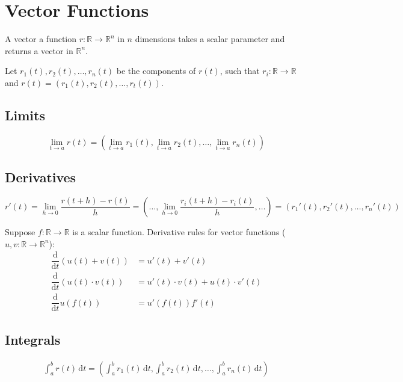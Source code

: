 \documentclass{article}
\newcommand*{\deriv}[1][x]{\ensuremath{\dfrac{\mathrm{d}}{\mathrm{d}#1}}}
\begin{document}
\section{Vector Functions}

A vector a function $r:\mathbb R\to\mathbb R^n$ in $n$ dimensions takes a scalar parameter and returns a vector in $\mathbb R^n$.

Let $r_1(t),r_2(t),\ldots,r_n(t)$ be the components of $r(t)$, such that $r_i:\mathbb R\to\mathbb R$ and $r(t)=(r_1(t),r_2(t),\ldots,r_t(t))$.

\subsection{Limits}

\begin{equation*}
	\lim_{t\to a}r(t)
	=\left( \lim_{t\to a}r_1(t), \lim_{t\to a}r_2(t), \ldots, \lim_{t\to a}r_n(t)\right)
\end{equation*}

\subsection{Derivatives}

\begin{equation*}
    r'(t)
	=\lim_{h\to 0}\frac{r(t+h)-r(t)}{h}
	=\left( \ldots, \lim_{h\to 0}\frac{r_i(t+h)-r_i(t)}{h},\ldots \right)
	=\left( r_1'(t),r_2'(t),\ldots,r_n'(t) \right)
\end{equation*}

Suppose $f:\mathbb R\to\mathbb R$ is a scalar function. Derivative rules for vector functions ($u,v:\mathbb R\to \mathbb R^n$):
\begin{align*}
    \deriv[t](u(t)+v(t))
	&=u'(t)+v'(t) \\
	\deriv[t](u(t)\cdot v(t))
	&=u'(t)\cdot v(t)+u(t)\cdot v'(t) \\
	\deriv[t]u(f(t))
	&=u'(f(t))f'(t)
\end{align*}

\subsection{Integrals}

\begin{align*}
    \int_{a}^{b}r(t)\,\mathrm{d}t
	=\left( \int_{a}^{b}r_1(t)\,\mathrm{d}t, \int_{a}^{b}r_2(t)\,\mathrm{d}t,\ldots,\int_{a}^{b}r_n(t)\,\mathrm{d}t \right)
\end{align*}
\end{document}
